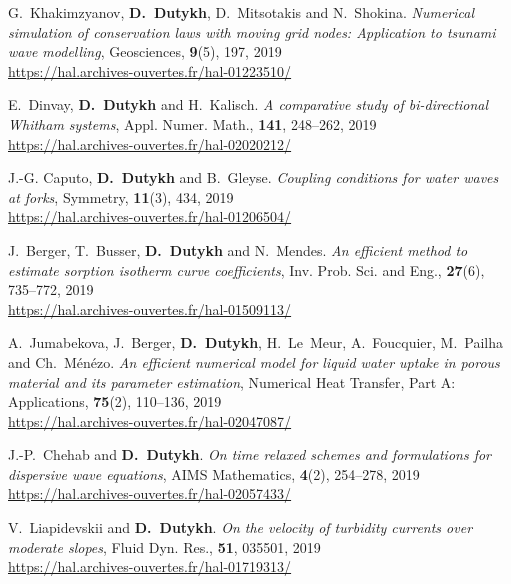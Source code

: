 \documentclass[final, a4paper, oneside, 12pt]{article}
\numberwithin{equation}{section}
\begin{document}
\begin{etaremune}
  \item G.~Khakimzyanov, \textbf{D.~Dutykh}, D.~Mitsotakis and N.~Shokina. \textit{Numerical simulation of conservation laws with moving grid nodes: Application to tsunami wave modelling}, Geosciences, \textbf{9}(5), 197, 2019 \\ %
  \url{https://hal.archives-ouvertes.fr/hal-01223510/}

  \item E.~Dinvay, \textbf{D.~Dutykh} and H.~Kalisch. \textit{A comparative study of bi-directional Whitham systems}, Appl. Numer. Math., \textbf{141}, 248--262, 2019 \\ %
  \url{https://hal.archives-ouvertes.fr/hal-02020212/}
  
  \item J.-G. Caputo, \textbf{D.~Dutykh} and B.~Gleyse. \textit{Coupling conditions for water waves at forks}, Symmetry, \textbf{11}(3), 434, 2019 \\ %
  \url{https://hal.archives-ouvertes.fr/hal-01206504/}
  
  \item J.~Berger, T.~Busser, \textbf{D.~Dutykh} and N.~Mendes. \textit{An efficient method to estimate sorption isotherm curve coefficients},  Inv. Prob. Sci. and Eng., \textbf{27}(6), 735--772, 2019 \\ %
  \url{https://hal.archives-ouvertes.fr/hal-01509113/}
  
  \item A.~Jumabekova, J.~Berger, \textbf{D.~Dutykh}, H.~Le~Meur, A.~Foucquier, M.~Pailha and Ch.~M\'en\'ezo. \textit{An efficient numerical model for liquid water uptake in porous material and its parameter estimation}, Numerical Heat Transfer, Part A: Applications, \textbf{75}(2), 110--136, 2019 \\ %
  \url{https://hal.archives-ouvertes.fr/hal-02047087/}
  
  \item J.-P.~Chehab and \textbf{D.~Dutykh}. \textit{On time relaxed schemes and formulations for dispersive wave equations}, AIMS Mathematics, \textbf{4}(2), 254--278, 2019 \\ %
  \url{https://hal.archives-ouvertes.fr/hal-02057433/}
  
  \item V.~Liapidevskii and \textbf{D.~Dutykh}. \textit{On the velocity of turbidity currents over moderate slopes}, Fluid Dyn. Res., \textbf{51}, 035501, 2019 \\ %
  \url{https://hal.archives-ouvertes.fr/hal-01719313/}
  

\end{etaremune}
\end{document}
